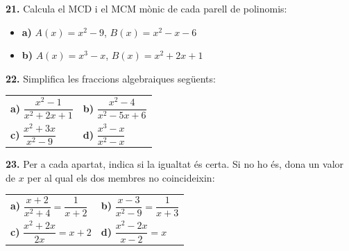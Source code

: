 \documentclass[13pt,a4paper]{extarticle}
\begin{document}
\par\noindent\begin{minipage}{\linewidth}
\textbf{21.} Calcula el MCD i el MCM mònic de cada parell de polinomis:\par

\begin{itemize}[leftmargin=0pt,itemsep=3pt,topsep=3pt,parsep=0pt,label={}]
\item \textbf{a)} $A(x)=x^2-9$, $B(x)=x^2-x-6$
\item \textbf{b)} $A(x)=x^3-x$, $B(x)=x^2+2x+1$
\end{itemize}
\end{minipage}\par\vspace{1.6mm}
\par\noindent\begin{minipage}{\linewidth}
\textbf{22.} Simplifica les fraccions algebraiques següents:\par

\begin{tabular}{@{}p{.46\linewidth}p{.46\linewidth}@{}}
\textbf{a)} $\dfrac{x^2-1}{x^2+2x+1}$ & \textbf{b)} $\dfrac{x^2-4}{x^2-5x+6}$ \\[2pt]
\textbf{c)} $\dfrac{x^2+3x}{x^2-9}$ & \textbf{d)} $\dfrac{x^3-x}{x^2-x}$ \\[2pt]
\end{tabular}\par
\end{minipage}\par\vspace{1.6mm}
\par\noindent\begin{minipage}{\linewidth}
\textbf{23.} Per a cada apartat, indica si la igualtat és certa. Si no ho és, dona un valor de $x$ per al qual els dos membres no coincideixin:\par

\begin{tabular}{@{}p{.46\linewidth}p{.46\linewidth}@{}}
\textbf{a)} $\dfrac{x+2}{x^2+4}=\dfrac{1}{x+2}$ & \textbf{b)} $\dfrac{x-3}{x^2-9}=\dfrac{1}{x+3}$ \\[2pt]
\textbf{c)} $\dfrac{x^2+2x}{2x}=x+2$ & \textbf{d)} $\dfrac{x^2-2x}{x-2}=x$ \\[2pt]
\end{tabular}\par
\end{minipage}\par\vspace{1.6mm}
\end{document}
